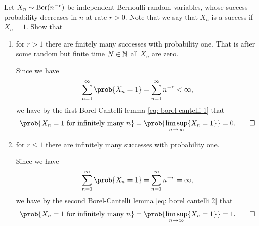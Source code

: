 \begin{exercise}
    Let \(X_n \sim \mathrm{Ber}(n^{-r})\) be independent Bernoulli random variables,
    whose success probability decreases in \(n\) at rate \(r > 0\). Note that we say
    that \(X_n\) is a success if \(X_n = 1\). Show that
    \begin{enumerate}[label=(\alph*)]
        \item for \(r > 1\) there are finitely many successes with probability one.
        That is after some random but finite time \(N\in \mathbb{N}\) all \(X_n\) are zero.
        \begin{solution}
            Since we have
            \[
                \sum_{n=1}^\infty \prob{X_n = 1} = \sum_{n=1}^\infty n^{-r} < \infty,
            \]
            we have by the first Borel-Cantelli lemma \eqref{eq: borel cantelli 1} that
            \[
                \prob{X_n=1 \text{ for infinitely many } n} = \prob{\limsup_{n\to \infty} \set{X_n = 1}} = 0.
                \qedhere
            \]
        \end{solution}

        \item for \(r \le 1\) there are infinitely many successes with probability one.
        \begin{solution}
            Since we have
            \[
                \sum_{n=1}^\infty \prob{X_n = 1} = \sum_{n=1}^\infty n^{-r} = \infty,
            \]
            we have by the second Borel-Cantelli lemma \eqref{eq: borel cantelli 2} that
            \[
                \prob{X_n=1 \text{ for infinitely many } n} = \prob{\limsup_{n\to \infty} \set{X_n = 1}} = 1.
                \qedhere
            \]
        \end{solution}
    \end{enumerate}
\end{exercise}

